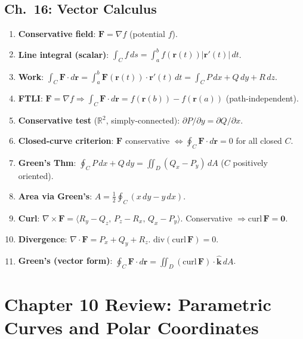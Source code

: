 \documentclass[12pt]{article}
\theoremstyle{compact}
\renewcommand{\vec}[1]{\mathbf{#1}}
\newcommand{\R}{\mathbb{R}}
\begin{document}
\subsection{Ch.\ 16: Vector Calculus}
\begin{enumerate}[label=\textbf{16.\arabic*.},leftmargin=*,itemsep=1pt]
  \item \textbf{Conservative field}: $\vec{F}=\nabla f$ (potential $f$).
  \item \textbf{Line integral (scalar)}: $\int_C f\,ds=\int_a^b f(\vec{r}(t))|\vec{r}'(t)|\,dt$.
  \item \textbf{Work}: $\int_C\vec{F}\cdot d\vec{r}=\int_a^b\vec{F}(\vec{r}(t))\cdot\vec{r}'(t)\,dt=\int_C P\,dx+Q\,dy+R\,dz$.
  \item \textbf{FTLI}: $\vec{F}=\nabla f\Rightarrow\int_C\vec{F}\cdot d\vec{r}=f(\vec{r}(b))-f(\vec{r}(a))$ (path-independent).
  \item \textbf{Conservative test} ($\R^2$, simply-connected): $\partial P/\partial y=\partial Q/\partial x$.
  \item \textbf{Closed-curve criterion}: $\vec{F}$ conservative $\iff\oint_C\vec{F}\cdot d\vec{r}=0$ for all closed $C$.
  \item \textbf{Green's Thm}: $\oint_C P\,dx+Q\,dy=\iint_D(Q_x-P_y)\,dA$ ($C$ positively oriented).
  \item \textbf{Area via Green's}: $A=\tfrac{1}{2}\oint_C(x\,dy-y\,dx)$.
  \item \textbf{Curl}: $\nabla\times\vec{F}=\langle R_y-Q_z,\,P_z-R_x,\,Q_x-P_y\rangle$. Conservative $\Rightarrow\mathrm{curl}\,\vec{F}=\vec{0}$.
  \item \textbf{Divergence}: $\nabla\cdot\vec{F}=P_x+Q_y+R_z$. $\mathrm{div}(\mathrm{curl}\,\vec{F})=0$.
  \item \textbf{Green's (vector form)}: $\oint_C\vec{F}\cdot d\vec{r}=\iint_D(\mathrm{curl}\,\vec{F})\cdot\hat{\mathbf{k}}\,dA$.
\end{enumerate}

\newpage

\section{Chapter 10 Review: Parametric Curves and Polar Coordinates}

\begin{center}
\end{center}
\end{document}
